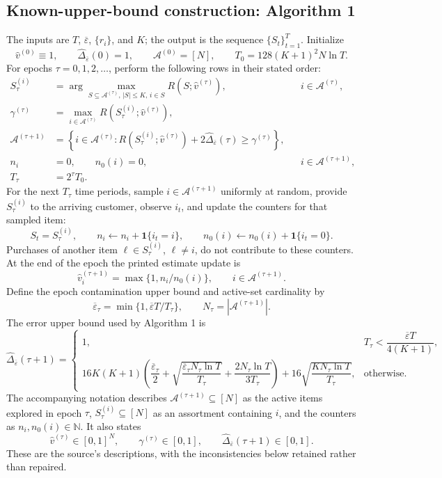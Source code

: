 \documentclass{article}
\begin{document}
\subsection*{Known-upper-bound construction: Algorithm 1}
The inputs are $T$, $\overline\varepsilon$, $\{r_i\}$, and $K$; the output is the sequence $\{S_t\}_{t=1}^{T}$. Initialize
\[
\widehat v^{(0)}\equiv1,\qquad
\widehat\Delta_{\overline\varepsilon}(0)=1,\qquad
\mathcal A^{(0)}=[N],\qquad
T_0=128(K+1)^2N\ln T.
\]
For epochs $\tau=0,1,2,\ldots$, perform the following rows in their stated order:
\[
\begin{aligned}
S_\tau^{(i)}
&=\arg\max_{S\subseteq\mathcal A^{(\tau)},\,|S|\le K,\,i\in S}
 R(S;\widehat v^{(\tau)}),
&&i\in\mathcal A^{(\tau)},\\
\gamma^{(\tau)}
&=\max_{i\in\mathcal A^{(\tau)}}R(S_\tau^{(i)};\widehat v^{(\tau)}),\\
\mathcal A^{(\tau+1)}
&=\left\{i\in\mathcal A^{(\tau)}:
R(S_\tau^{(i)};\widehat v^{(\tau)})
+2\widehat\Delta_{\overline\varepsilon}(\tau)\ge\gamma^{(\tau)}\right\},\\
n_i&=0,\qquad n_0(i)=0,
&&i\in\mathcal A^{(\tau+1)},\\
T_\tau&=2^\tau T_0.
\end{aligned}
\]
For the next $T_\tau$ time periods, sample $i\in\mathcal A^{(\tau+1)}$ uniformly at random, provide $S_\tau^{(i)}$ to the arriving customer, observe $i_t$, and update the counters for that sampled item:
\[
S_t=S_\tau^{(i)},\qquad
n_i\leftarrow n_i+\mathbf1\{i_t=i\},\qquad
n_0(i)\leftarrow n_0(i)+\mathbf1\{i_t=0\}.
\]
Purchases of another item $\ell\in S_\tau^{(i)}$, $\ell\ne i$, do not contribute to these counters. At the end of the epoch the printed estimate update is
\[
\widehat v_i^{(\tau+1)}
=\max\{1,n_i/n_0(i)\},\qquad i\in\mathcal A^{(\tau+1)}.
\]
Define the epoch contamination upper bound and active-set cardinality by
\[
\overline\varepsilon_\tau
=\min\{1,\overline\varepsilon T/T_\tau\},\qquad
N_\tau=|\mathcal A^{(\tau+1)}|.
\]
The error upper bound used by Algorithm 1 is
\[
\widehat\Delta_{\overline\varepsilon}(\tau+1)
=\begin{cases}
1,&T_\tau<\dfrac{\overline\varepsilon T}{4(K+1)},\\[6pt]
16K(K+1)\left(
\dfrac{\overline\varepsilon_\tau}{2}
+\sqrt{\dfrac{\overline\varepsilon_\tau N_\tau\ln T}{T_\tau}}
+\dfrac{2N_\tau\ln T}{3T_\tau}
\right)
+16\sqrt{\dfrac{KN_\tau\ln T}{T_\tau}},&\text{otherwise}.
\end{cases}
\]
The accompanying notation describes $\mathcal A^{(\tau+1)}\subseteq[N]$ as the active items explored in epoch $\tau$, $S_\tau^{(i)}\subseteq[N]$ as an assortment containing $i$, and the counters as $n_i,n_0(i)\in\mathbb N$. It also states
\[
\widehat v^{(\tau)}\in[0,1]^N,\qquad
\gamma^{(\tau)}\in[0,1],\qquad
\widehat\Delta_{\overline\varepsilon}(\tau+1)\in[0,1].
\]
These are the source's descriptions, with the inconsistencies below retained rather than repaired.
\end{document}
